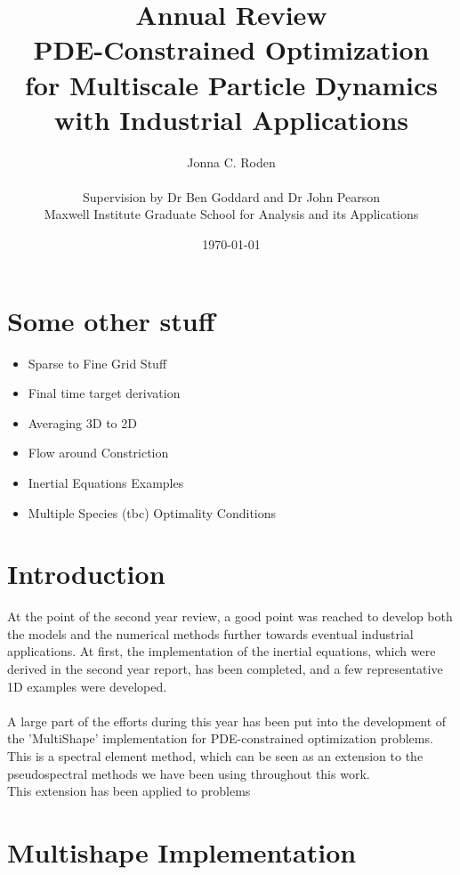 \documentclass[11pt, a4paper]{article}
\title{{\huge Annual Review \\ PDE-Constrained Optimization \\for Multiscale Particle Dynamics} \\ with Industrial Applications}
\author{Jonna C. Roden\\ \\Supervision by Dr Ben Goddard and Dr John Pearson\\ \vspace{0.5cm} Maxwell Institute Graduate School for Analysis and its Applications}
\date{\today}
\theoremstyle{definition}
\begin{document}
	\maketitle
	
	\newpage
	\tableofcontents
	\newpage
	
	\section{Some other stuff}
	\begin{itemize}
		\item Sparse to Fine Grid Stuff
		\item Final time target derivation
		\item Averaging 3D to 2D
		\item Flow around Constriction
		\item Inertial Equations Examples
		\item Multiple Species (tbc) Optimality Conditions
	\end{itemize}


	\section{Introduction}
	At the point of the second year review, a good point was reached to develop both the models and the numerical methods further towards eventual industrial applications. 
	At first, the implementation of the inertial equations, which were derived in the second year report, has been completed, and a few representative 1D examples were developed.\\
	\\
	A large part of the efforts during this year has been put into the development of the 'MultiShape' implementation for PDE-constrained optimization problems. This is a spectral element method, which can be seen as an extension to the pseudospectral methods we have been using throughout this work.\\
	This extension has been applied to problems 
	

	
	\section{Multishape Implementation}
		
	
\end{document}
